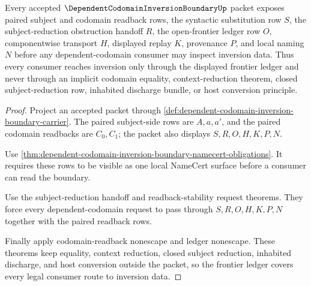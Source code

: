 \begin{theorem}
\label{thm:dependent-codomain-inversion-boundary-frontier-coverage}
Every accepted $\DependentCodomainInversionBoundaryUp$ packet exposes paired subject and codomain readback rows, the syntactic substitution row $S$, the subject-reduction obstruction handoff $R$, the open-frontier ledger row $O$, componentwise transport $H$, displayed replay $K$, provenance $P$, and local naming $N$ before any dependent-codomain consumer may inspect inversion data. Thus every consumer reaches inversion only through the displayed frontier ledger and never through an implicit codomain equality, context-reduction theorem, closed subject-reduction row, inhabited discharge bundle, or host conversion principle.
\end{theorem}
\begin{proof}
Project an accepted packet through \autoref{def:dependent-codomain-inversion-boundary-carrier}. The paired subject-side rows are $A,a,a'$, and the paired codomain readbacks are $C_0,C_1$; the packet also displays $S,R,O,H,K,P,N$.

Use \autoref{thm:dependent-codomain-inversion-boundary-namecert-obligations}. It requires these rows to be visible as one local NameCert surface before a consumer can read the boundary.

Use the subject-reduction handoff and readback-stability request theorems. They force every dependent-codomain request to pass through $S,R,O,H,K,P,N$ together with the paired readback rows.

Finally apply codomain-readback nonescape and ledger nonescape. These theorems keep equality, context reduction, closed subject reduction, inhabited discharge, and host conversion outside the packet, so the frontier ledger covers every legal consumer route to inversion data.
\end{proof}

